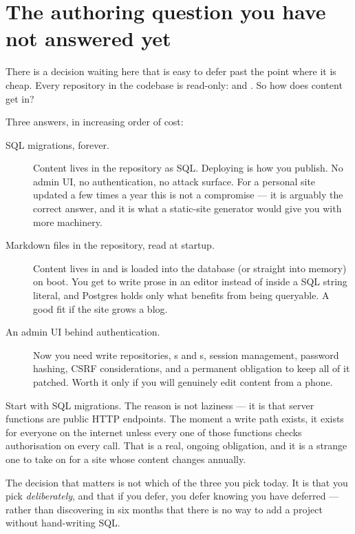 \section{The authoring question you have not answered yet}

There is a decision waiting here that is easy to defer past the point where it is cheap. Every
repository in the codebase is read-only:  and . So how does content
get in?

Three answers, in increasing order of cost:

\begin{description}
  \item[SQL migrations, forever.] Content lives in the repository as SQL. Deploying is how you
    publish. No admin UI, no authentication, no attack surface. For a personal site updated a few
    times a year this is not a compromise --- it is arguably the correct answer, and it is what a
    static-site generator would give you with more machinery.

  \item[Markdown files in the repository, read at startup.] Content lives in
     and is loaded into the database (or straight into memory) on boot. You get
    to write prose in an editor instead of inside a SQL string literal, and Postgres holds only
    what benefits from being queryable. A good fit if the site grows a blog.

  \item[An admin UI behind authentication.] Now you need write repositories, s and
    s, session management, password hashing, CSRF considerations, and a
    permanent obligation to keep all of it patched. Worth it only if you will genuinely edit
    content from a phone.
\end{description}

\begin{pattern}
Start with SQL migrations. The reason is not laziness --- it is that server functions are public
HTTP endpoints. The moment a write path exists, it exists for everyone on the internet unless every
one of those functions checks authorisation on every call. That is a real, ongoing obligation, and
it is a strange one to take on for a site whose content changes annually.

The decision that matters is not which of the three you pick today. It is that you pick
\emph{deliberately}, and that if you defer, you defer knowing you have deferred --- rather than
discovering in six months that there is no way to add a project without hand-writing SQL.
\end{pattern}
